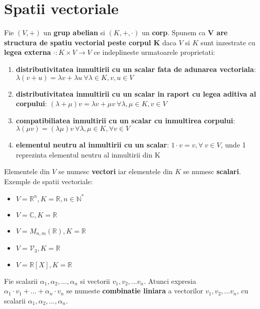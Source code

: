\documentclass{article}
\begin{document}
        \section{Spatii vectoriale}
            Fie $(V, +)$ un \textbf{grup abelian} si $(K, +, \cdot)$ un \textbf{corp}. Spunem ca \textbf{V are structura de spatiu vectorial peste corpul K}
            daca $V$ si $K$ sunt inzestrate cu \textbf{legea externa} $\cdot:K\times V\rightarrow V$ ce indeplineste urmatoarele proprietati:
        	\begin{enumerate}
                \item \textbf{distributivitatea inmultirii cu un scalar fata de adunarea vectoriala}: $\lambda(v + u)= \lambda v + \lambda u\ \forall \lambda \in K, v,u \in V$
                \item \textbf{distributivitatea inmultirii cu un scalar in raport cu legea aditiva al corpului}: $(\lambda + \mu)v = \lambda  v + \mu v\ \forall
                    \lambda, \mu \in K, v \in V$
                \item \textbf{compatibiliatea inmultirii cu un scalar cu inmultirea corpului}: $\lambda (\mu v) = (\lambda \mu)v\ \forall \lambda,\mu \in K,
                    \forall v\in V$
        		\item \textbf{elementul neutru al inmultirii cu un scalar}: $1 \cdot v = v, \forall \ v \in V$, unde 1 reprezinta elementul neutru al inmultirii
                    din K
        	\end{enumerate}
        Elementele din $V$ se numesc \textbf{vectori} iar elementele din $K$ se numesc \textbf{scalari}.\\
        Exemple de spatii vectoriale:
        \begin{itemize}
        	\item $V = \mathbb{R}^{n}, K = \mathbb{R}, n \in \mathbb{N}^*$
        	\item $V = \mathbb{C}, K = \mathbb{R}$
        	\item $V = M_{n,m}(\mathbb{R}), K = \mathbb{R}$
            \item $V = \mathscr{V}_{3}, K = \mathbb{R}$
        	\item $V = \mathbb{R}[X], K = \mathbb{R}$
        \end{itemize}
        Fie scalarii $\alpha_{1}, \alpha_{2}, \dots, \alpha_{n}$ si vectorii $v_{1}, v_{2}, \dots v_{n}$. Atunci expresia $\alpha_{1} \cdot v_{1} + \dots +
        \alpha_{n} \cdot v_{n}$ se numeste \textbf{combinatie liniara} a vectorilor $v_{1}, v_{2}, \dots v_{n}$, cu scalarii $\alpha_{1}, \alpha_{2}, \dots, \alpha_{n}$. \\ \\
\end{document}
